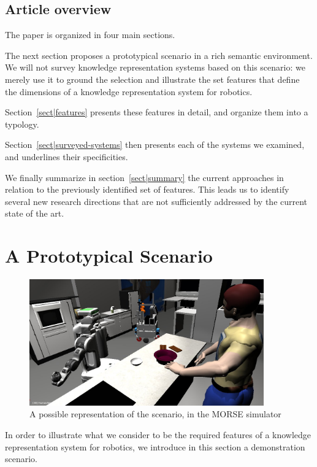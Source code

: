 \documentclass[a4paper, twocolumn]{article}
\begin{document}
\subsection{Article overview}
\label{sect|overview}

The paper is organized in four main sections.

The next section proposes a prototypical scenario in a rich semantic
environment. We will not survey knowledge representation systems based on this
scenario: we merely use it to ground the selection and illustrate the set
features that define the dimensions of a
knowledge representation system for robotics.

Section~\ref{sect|features} presents these features in detail, and organize
them into a typology.

Section~\ref{sect|surveyed-systems} then presents each of the systems we
examined, and underlines their specificities.

We finally summarize in section~\ref{sect|summary} the current approaches in
relation to the previously identified set of features. This leads us to
identify several new research directions that are not sufficiently addressed by
the current state of the art.

\section{A Prototypical Scenario}
\label{sect|scenario}

\begin{figure}
	\centering
	\includegraphics[width=0.9\textwidth]{figs/brownie_scenario.jpg}
	\caption{A possible representation of the scenario, in the MORSE simulator}
	\label{fig|scenario}
\end{figure}

In order to illustrate what we consider to be the required features of a
knowledge representation system for robotics, we introduce in this section a
demonstration scenario.
\end{document}
